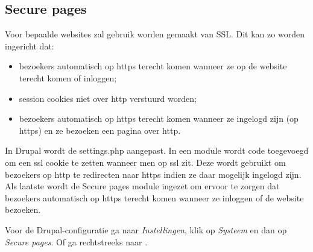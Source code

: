 \subsection{Secure pages}\label{securepages}

Voor bepaalde websites zal gebruik worden gemaakt van SSL. Dit kan zo worden ingericht dat:

\begin{itemize}
\item bezoekers automatisch op https terecht komen wanneer ze op de website terecht komen of inloggen;
\item session cookies niet over http verstuurd worden;
\item bezoekers automatisch op https terecht komen wanneer ze ingelogd zijn (op https) en ze bezoeken een pagina over http.
\end{itemize}

In Drupal wordt de settings.php aangepast. In een module wordt code toegevoegd om een ssl cookie te zetten wanneer men op ssl zit. Deze wordt gebruikt om bezoekers op http te redirecten naar https indien ze daar mogelijk ingelogd zijn. Als laatste wordt de Secure pages module ingezet om ervoor te zorgen dat bezoekers automatisch op https terecht komen wanneer ze inloggen of de website bezoeken.

Voor de Drupal-configuratie ga naar \emph{Instellingen}, klik op \emph{Systeem} en dan op \emph{Secure pages}. Of ga rechtstreeks naar .